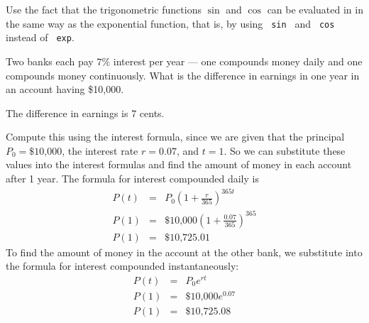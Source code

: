 \documentclass{ximera}
\begin{document}
 Use the fact that the trigonometric functions $\sin$ and
$\cos$ can be evaluated in \Matlab in the same way as the exponential
function, that is, by using \verb+ sin +  and
\verb+ cos +  instead of \verb+ exp+.

\begin{exercise} \label{c3.1.8}
Two banks each pay $7\%$ interest per year --- one compounds money
daily and one compounds money continuously.  What is the difference
in earnings in one year in an account having \$10,000.

\begin{solution}

\ans The difference in earnings is 7 cents.

\soln Compute this using the interest
formula, since we are given that the principal $P_0 = \$10\mbox{,}000$,
the interest rate $r = 0.07$, and $t = 1$.  So we can substitute
these values into the interest formulas and find the amount of money
in each account after 1 year.  The formula for interest compounded daily is
\[ \begin{array}{rcl}
P(t) & = & P_0\left(1 + \frac{r}{365}\right)^{365t} \\
P(1) & = & \$10\mbox{,}000\left(1 + \frac{0.07}{365}\right)^{365} \\
P(1) & = & \$10\mbox{,}725.01\end{array}
\]
To find the amount of money in the account at the other bank, we substitute
into the formula for interest compounded instantaneously:
\[ \begin{array}{rcl}
P(t) & = & P_0e^{rt} \\
P(1) & = & \$10\mbox{,}000e^{0.07} \\
P(1) & = & \$10\mbox{,}725.08\end{array}
\]

\end{solution}
\end{exercise}
\end{document}
